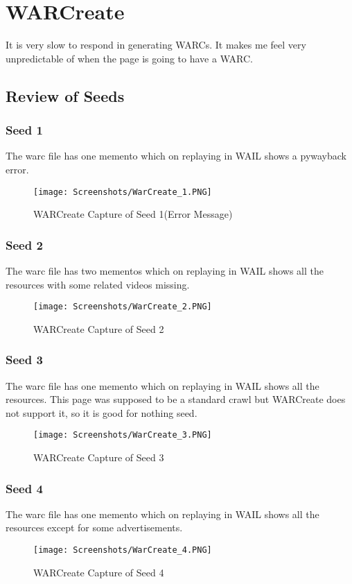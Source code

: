 \documentclass[11pt,journal,compsoc,onecolumn]{IEEEtran}
\begin{document}
\section{WARCreate}
It is very slow to respond in generating WARCs. It makes me feel very unpredictable of when the page is going to have a WARC.
\subsection{Review of  Seeds}
\subsubsection{Seed 1}
The warc file has one memento which on replaying in WAIL shows a pywayback error. 
 \begin{figure}[ht] 
  \centering
  \texttt{[image: Screenshots/WarCreate\_1.PNG]}
  \caption{WARCreate Capture of Seed 1(Error Message)}
  \label{fig:55}
\end{figure}
\subsubsection{Seed 2}
The warc file has two mementos which on replaying in WAIL shows all the resources with some related videos missing. 
 \begin{figure}[ht] 
  \centering
  \texttt{[image: Screenshots/WarCreate\_2.PNG]}
  \caption{WARCreate Capture of Seed 2}
  \label{fig:56}
\end{figure}
\subsubsection{Seed 3}
The warc file has one memento which on replaying in WAIL shows all the resources. This page was supposed to be a standard crawl but WARCreate does not support it, so it is good for nothing seed.  
 \begin{figure}[ht] 
  \centering
  \texttt{[image: Screenshots/WarCreate\_3.PNG]}
  \caption{WARCreate Capture of Seed 3}
  \label{fig:57}
\end{figure}
\subsubsection{Seed 4}
The warc file has one memento which on replaying in WAIL shows all the resources except for some advertisements. 
 \begin{figure}[ht] 
  \centering
  \texttt{[image: Screenshots/WarCreate\_4.PNG]}
  \caption{WARCreate Capture of Seed 4}
  \label{fig:59}
\end{figure}
\end{document}
